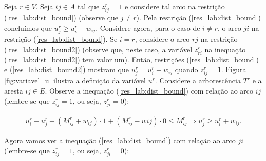 Seja $r \in V$.
Seja $ij \in A$ tal que $z^{r}_{ij} = 1$ e considere tal arco na restrição
(\ref{res_lab:dist_bound}) (observe que $j \neq r$).
Pela restrição (\ref{res_lab:dist_bound}) concluímos que
$u^r_j \ge u^r_i + w_{ij}$. Considere agora, para o caso de $i \neq r$, 
o arco $ji$ na restrição (\ref{res_lab:dist_bound}). Se $i = r$,
considere o arco $rj$ na restrição (\ref{res_lab:dist_bound2}) (observe que,
neste caso,
a variável $z^r_{ri}$ na inequação (\ref{res_lab:dist_bound2}) tem valor um).
Então, restrições
(\ref{res_lab:dist_bound}) e (\ref{res_lab:dist_bound2}) mostram que
$u^r_j = u^r_i + w_{ij}$ quando $z^{r}_{ij} = 1$. Figura \ref{fig:variavel_u}
ilustra a definição da variável $u^r$. Considere a arborescência $T^{r}$ e
a aresta $ij \in E$. Observe a inequação (\ref{res_lab:dist_bound})
com relação ao arco $ij$ (lembre-se que $z^r_{ij} = 1$, ou seja, $z^r_{ji} = 0$):

\begin{align*}
  u^{r}_i - u^{r}_j + (M^{r}_{ij} + w_{ij}) \cdot 1 + (M^{r}_{ij} - w{ij}) \cdot 0 \le M^{r}_{ij} \Rightarrow u^{r}_j \ge u^{r}_i + w_{ij}.
\end{align*}

Agora vamos ver a inequação (\ref{res_lab:dist_bound})
com relação ao arco $ji$ (lembre-se que $z^r_{ij} = 1$, ou seja, $z^r_{ji} = 0$):

